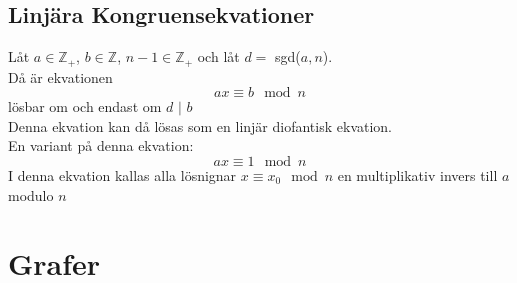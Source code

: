 \documentclass{article}
\begin{document}
	\subsection{Linjära Kongruensekvationer}
	Låt $a \in \mathbb{Z}_{+}$, $b \in \mathbb{Z}$, $n-1 \in \mathbb{Z}_{+}$ och låt $d = $ sgd($a, n$). \\
	Då är ekvationen \\
	$$
	ax \equiv b \mod n
	$$
	lösbar om och endast om $d$ $|$ $b$ \\
	Denna ekvation kan då lösas som en linjär diofantisk ekvation. \\
	En variant på denna ekvation: \\
	$$
	ax \equiv 1 \mod n
	$$
	I denna ekvation kallas alla lösnignar $x \equiv x_{0} \mod n$ en multiplikativ invers till $a$ modulo $n$
	\section{Grafer}
\end{document}
